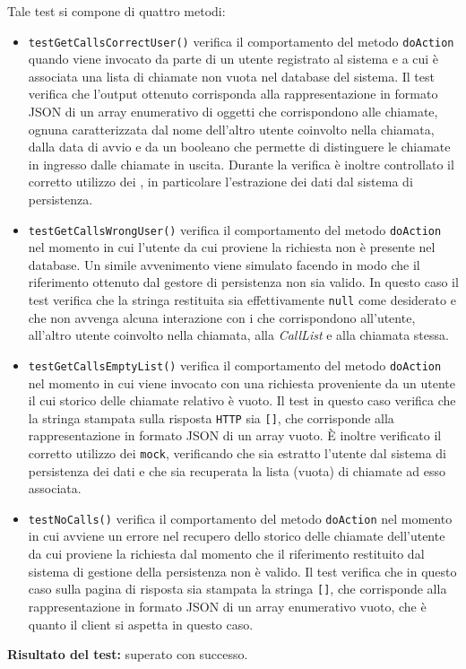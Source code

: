 \begin{itemize}
Tale test si compone di quattro metodi:
\begin{itemize}
\item \texttt{testGetCallsCorrectUser()} verifica il comportamento del metodo \texttt{doAction} quando viene invocato da parte di un utente registrato al sistema e a cui è associata una lista di chiamate non vuota nel database del sistema. Il test verifica che l'output ottenuto corrisponda alla rappresentazione in formato JSON di un array enumerativo di oggetti che corrispondono alle chiamate, ognuna caratterizzata dal nome dell'altro utente coinvolto nella chiamata, dalla data di avvio e da un  booleano che permette di distinguere le chiamate in ingresso dalle chiamate in uscita. Durante la verifica è inoltre controllato il corretto utilizzo dei , in particolare l'estrazione dei dati dal sistema di persistenza.

\item \texttt{testGetCallsWrongUser()} verifica il comportamento del metodo \texttt{doAction} nel momento in cui l'utente da cui proviene la richiesta non è presente nel database. Un simile avvenimento viene simulato facendo in modo che il riferimento ottenuto dal gestore di persistenza non sia valido. In questo caso il test verifica che la stringa restituita sia effettivamente \texttt{null} come desiderato e che non avvenga alcuna interazione con i  che corrispondono all'utente, all'altro utente coinvolto nella chiamata, alla \textit{CallList} e alla chiamata stessa.

\item \texttt{testGetCallsEmptyList()} verifica il comportamento del metodo \texttt{doAction} nel momento in cui viene invocato con una richiesta proveniente da un utente il cui storico delle chiamate relativo è vuoto. Il test in questo caso verifica che la stringa stampata sulla risposta \texttt{HTTP} sia \texttt{[]}, che corrisponde alla rappresentazione in formato JSON di un array vuoto. È inoltre verificato il corretto utilizzo dei \texttt{mock}, verificando che sia estratto l'utente dal sistema di persistenza dei dati e che sia recuperata la lista (vuota) di chiamate ad esso associata.

\item \texttt{testNoCalls()} verifica il comportamento del metodo \texttt{doAction} nel momento in cui avviene un errore nel recupero dello storico delle chiamate dell'utente da cui proviene la richiesta dal momento che il riferimento restituito dal sistema di gestione della persistenza non è valido. Il test verifica che in questo caso sulla pagina di risposta sia stampata la stringa \texttt{[]}, che corrisponde alla rappresentazione in formato JSON di un array enumerativo vuoto, che è quanto il client si aspetta in questo caso.

\end{itemize}
\textbf{Risultato del test:} superato con successo.

\end{itemize}


